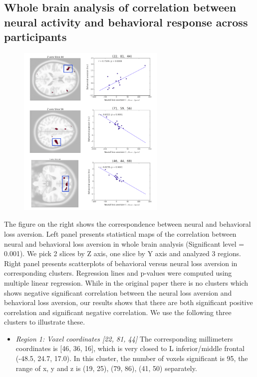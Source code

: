 \documentclass[11pt]{article}
\begin{document}
\newpage

\subsection{Whole brain analysis of correlation between neural activity and 
behavioral response across participants}

\begin{figure}
  \begin{center}
    \includegraphics[width=0.63\textwidth]{figures/Regression3/corr_neu_bah.png} 
  \end{center}
\end{figure}

The figure on the right shows the correspondence between neural and behavioral 
loss aversion. Left panel presents statistical maps of the correlation between 
neural and behavioral loss aversion in whole brain analysis (Significant level 
= 0.001). We pick 2 slices by Z axis, one slice by Y axis and analyzed 3 
regions. Right panel presents scatterplots of behavioral versus neural loss 
aversion in corresponding clusters. Regression lines and p-values were computed 
using multiple linear regression. While in the original paper there is no 
clusters which shows negative significant correlation between the neural loss 
aversion and behavioral loss aversion, our results shows that there are both 
significant positive correlation and significant negative correlation. We use 
the following three clusters to illustrate these.

\begin{itemize}
\item \emph{Region 1: Voxel coordinates [22, 81, 44]} The corresponding 
millimeters coordinates is [46, 36, 16], which is very closed to L 
inferior/middle frontal (-48.5, 24.7, 17.0). In this cluster, the number of 
voxels significant is 95, the range of x, y and z is (19, 25), (79, 86), 
(41, 50) separately.
\end{itemize}
\end{document}
